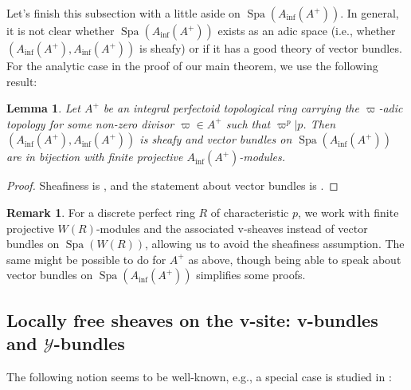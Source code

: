 \documentclass[10pt,twoside]{article}
\numberwithin{equation}{section}
\theoremstyle{plain}
\newtheorem{mylemma}[mythm]{Lemma}
\theoremstyle{definition}
\newtheorem{myrem}[mythm]{Remark}
\DeclareMathOperator{\Spa}{Spa}
\newcommand{\MCY}{\mathcal{Y}}
\DeclareMathOperator{\Inf}{inf}
\newcommand{\Ainf}{A_{\Inf}}
\begin{document}
Let's finish this subsection with a little aside on \(\Spa(\Ainf(A^+))\). In general, it is not clear whether \(\Spa(\Ainf(A^+))\) exists as an adic space (i.e., whether \((\Ainf(A^+), \Ainf(A^+))\) is sheafy) or if it has a good theory of vector bundles. For the analytic case in the proof of our main theorem, we use the following result:

\begin{mylemma}\label{liuAinf}
    Let \(A^+\) be an integral perfectoid topological ring carrying the \(\varpi\)-adic topology for some non-zero divisor \(\varpi\in A^+\) such that \(\varpi^p|p\).
    Then \((\Ainf(A^+), \Ainf(A^+))\) is sheafy and vector bundles on \(\Spa(\Ainf(A^+))\) are in bijection with finite projective \(\Ainf(A^+)\)-modules.
\end{mylemma}


\begin{proof}
    Sheafiness is \cite[Theorem 1.1]{Liu24}, and the statement about vector bundles is \cite[Theorem 1.4]{Liu24}.
\end{proof}

\begin{myrem}\label{discreteWittSheafiness}
    For a discrete perfect ring \(R\) of characteristic \(p\), we work with finite projective \(W(R)\)-modules and the associated v-sheaves instead of vector bundles on \(\Spa(W(R))\), allowing us to avoid the sheafiness assumption. The same might be possible to do for \(A^+\) as above, though being able to speak about vector bundles on \(\Spa(\Ainf(A^+))\) simplifies some proofs.
\end{myrem}
\subsection{\texorpdfstring{Locally free sheaves on the v-site: v-bundles and \(\MCY\)-bundles}
  {Locally free sheaves on the v-site: v-bundles and Y-bundles}}
The following notion seems to be well-known, e.g., a special case is studied in \cite{Heu21}:
\end{document}
